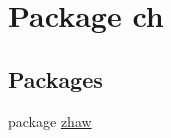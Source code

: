 \hypertarget{namespacech}{
\section{Package ch}
\label{namespacech}
}
\subsection*{Packages}
\begin{DoxyCompactItemize}
\item 
package \hyperlink{namespacech_1_1zhaw}{zhaw}
\end{DoxyCompactItemize}
